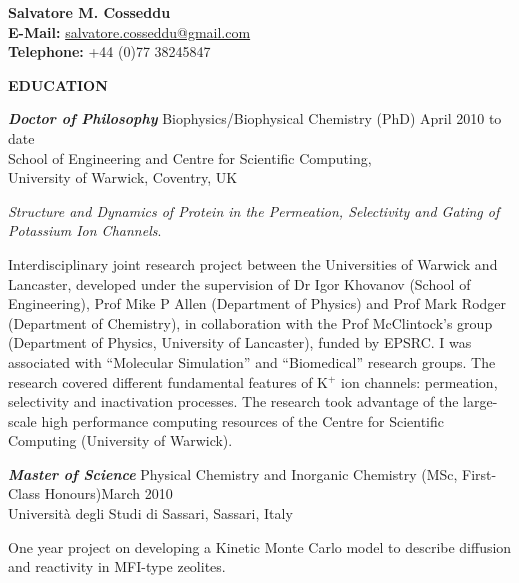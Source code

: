 \documentclass[a4paper,10pt,final]{letter}
\newcommand{\Sep}{\vspace{1em}}
\newcommand{\SmallSep}{\vspace{0.4em}}
\newcommand{\CVSection}[1]
	{\Large\textbf{#1}\par
	\SmallSep\normalsize\normalfont}
\newcommand{\CVItem}[2]
	{\textit{\textbf{\color{RoyalBlue} #1}} #2}
\begin{document}
\Huge {\bfseries \color{RoyalBlue} Salvatore M. Cosseddu} \\
\small
 \textbf{E-Mail:} \url{salvatore.cosseddu@gmail.com} \\
\textbf{Telephone:} +44 (0)77 38245847
\normalsize\normalfont
\SmallSep
\Sep

\CVSection{EDUCATION}
\CVItem{ Doctor of Philosophy}{Biophysics/Biophysical Chemistry (PhD) \hfill April 2010 to date} \\
School of Engineering and Centre for Scientific Computing, \\
University of Warwick, Coventry, UK %
\begin{description} [style=multiline,leftmargin=2.6cm,font=\normalfont,topsep=0.1cm,itemsep=-3.5pt]
\item [Thesis:] \textit{Structure and Dynamics of Protein in the Permeation, Selectivity
    and Gating of Potassium Ion Channels}.
\item [Research description:] Interdisciplinary joint research project between the
  Universities of Warwick and Lancaster, developed under the supervision of Dr Igor
  Khovanov (School of Engineering), Prof Mike P Allen (Department of Physics) and Prof
  Mark Rodger (Department of Chemistry), in collaboration with the Prof McClintock's group
  (Department of Physics, University of Lancaster), funded by EPSRC. I was associated with
  ``Molecular Simulation'' and ``Biomedical'' research groups. The research covered
  different fundamental features of K$^+$ ion channels: permeation, selectivity and
  inactivation processes. The research took advantage of the large-scale high performance
  computing resources of the Centre for Scientific Computing (University of
  Warwick).%
\end{description}
\SmallSep

\CVItem{Master of Science}{Physical Chemistry and Inorganic Chemistry (MSc, First-Class Honours)\hfill March 2010}\\
Universit\`a degli Studi di Sassari, Sassari, Italy %
\begin{description}[style=multiline,leftmargin=2.6cm,font=\normalfont,topsep=0.1cm,itemsep=-3.5pt]
\item [Final project:] One year project on developing a Kinetic Monte Carlo model to
  describe diffusion and reactivity in MFI-type zeolites.
\end{description}
  \SmallSep
 
\end{document}

